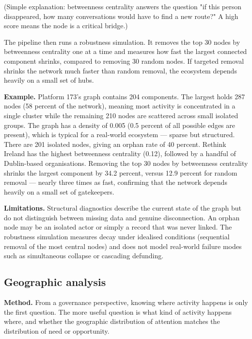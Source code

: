 \documentclass[11pt,a4paper]{article}
\begin{document}
(Simple explanation: betweenness centrality answers the question "if
this person disappeared, how many conversations would have to find a new
route?" A high score means the node is a critical bridge.)

The pipeline then runs a robustness simulation. It removes the top 30
nodes by betweenness centrality one at a time and measures how fast the
largest connected component shrinks, compared to removing 30 random
nodes. If targeted removal shrinks the network much faster than random
removal, the ecosystem depends heavily on a small set of hubs.

\textbf{Example.} Platform 173's graph contains 204 components. The largest
holds 287 nodes (58 percent of the network), meaning most activity is
concentrated in a single cluster while the remaining 210 nodes are
scattered across small isolated groups. The graph has a density of 0.005
(0.5 percent of all possible edges are present), which is typical for a
real-world ecosystem — sparse but structured. There are 201 isolated
nodes, giving an orphan rate of 40 percent. Rethink Ireland has the
highest betweenness centrality (0.12), followed by a handful of
Dublin-based organisations. Removing the top 30 nodes by betweenness
centrality shrinks the largest component by 34.2 percent, versus 12.9
percent for random removal — nearly three times as fast, confirming that
the network depends heavily on a small set of gatekeepers.

\textbf{Limitations.} Structural diagnostics describe the current state of
the graph but do not distinguish between missing data and genuine
disconnection. An orphan node may be an isolated actor or simply a
record that was never linked. The robustness simulation measures decay
under idealised conditions (sequential removal of the most central
nodes) and does not model real-world failure modes such as simultaneous
collapse or cascading defunding.

\subsection{Geographic analysis}

\textbf{Method.} From a governance perspective, knowing where activity happens
is only the first question. The more useful question is what kind of
activity happens where, and whether the geographic distribution of
attention matches the distribution of need or opportunity.
\end{document}
